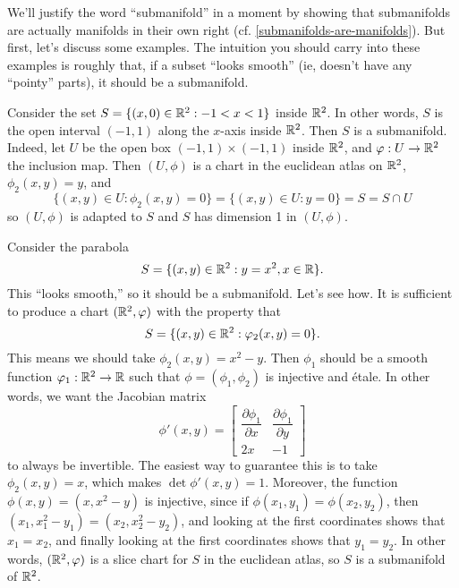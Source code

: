We'll justify the word ``submanifold'' in a moment by showing that submanifolds are actually manifolds in their own right (cf. \cref{submanifolds-are-manifolds}). But first, let's discuss some examples. The intuition you should carry into these examples is roughly that, if a subset ``looks smooth'' (ie, doesn't have any ``pointy'' parts), it should be a submanifold. 

\begin{example}
	Consider the set $S = \{ (x,0) \in \mathbb{R}^2 : -1 < x < 1 \}$ inside $\mathbb{R}^2$. In other words, $S$ is the open interval $(-1,1)$ along the $x$-axis inside $\mathbb{R}^2$. Then $S$ is a submanifold. Indeed, let $U$ be the open box $(-1,1) \times (-1,1)$ inside $\mathbb{R}^2$, and $\varphi : U \to \mathbb{R}^2$ the inclusion map. Then $(U, \phi)$ is a chart in the euclidean atlas on $\mathbb{R}^2$, $\phi_2(x,y) = y$, and 
	\[ \{ (x,y) \in U : \phi_2(x, y) = 0 \} = \{ (x,y) \in U : y = 0 \} = S = S \cap U \]
	so $(U,\phi)$ is adapted to $S$ and $S$ has dimension 1 in $(U,\phi)$. 
\end{example}

\begin{example}
	Consider the parabola \[ S = \{ (x, y) \in \mathbb{R}^2 : y = x^2, x \in \mathbb{R} \}. \] This ``looks smooth,'' so it should be a submanifold. Let's see how. It is sufficient to produce a chart $(\mathbb{R}^2, \varphi)$ with the property that 
	\[ S = \{ (x,y) \in \mathbb{R}^2 : \varphi_2(x,y) = 0 \}. \]
	This means we should take $\phi_2(x,y) = x^2 - y$. Then $\phi_1$ should be a smooth function $\varphi_1 : \mathbb{R}^2 \to \mathbb{R}$ such that $\phi = (\phi_1, \phi_2)$ is injective and \'etale. In other words, we want the Jacobian matrix 
	\[ \phi'(x,y) = \begin{bmatrix} \dfrac{\partial \phi_1}{\partial x} & \dfrac{\partial \phi_1}{\partial y} \\ 2x & -1 \end{bmatrix} \]
	to always be invertible. The easiest way to guarantee this is to take $\phi_2(x,y) = x$, which makes $\det \phi'(x,y) = 1$. Moreover, the function $\phi(x,y) = (x, x^2 - y)$ is injective, since if $\phi(x_1, y_1) = \phi(x_2,y_2)$, then $(x_1, x_1^2 - y_1) = (x_2, x_2^2 - y_2)$, and looking at the first coordinates shows that $x_1 = x_2$, and finally looking at the first coordinates shows that $y_1 = y_2$. In other words, $(\mathbb{R}^2, \varphi)$ is a slice chart for $S$ in the euclidean atlas, so $S$ is a submanifold of $\mathbb{R}^2$. 
\end{example}

\begin{comment}
	The subset  
	\[ S = \{(x,y) : y = |x|, x \in \R \} \]
	is ``pointy'' and does \emph{not} define a submanifold of $\R^2$. To see this formally, suppose there exists a chart $(U, \phi)$ on $\R^2$ that is adapted to $S$ and contains the origin. By making $U$ smaller, we can assume that $U$ is a box of the form $(-\epsilon, \epsilon) \times (-\epsilon, \epsilon)$. Then $S \cap U$ is neither all of $U$ nor just a point, so it must be that $S$ has codimension 1 in $(U, \phi)$. In other words, 
	\[ S \cap U = \{ (x,y) : \phi_1(x,y) = 0 \}. \]
\end{comment}

